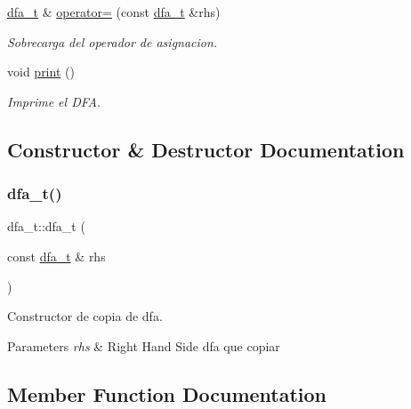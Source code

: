 \begin{DoxyCompactItemize}
\hyperlink{classdfa__t}{dfa\+\_\+t} \& \hyperlink{classdfa__t_a803484b912714d5694ddf7f7d1193915}{operator=} (const \hyperlink{classdfa__t}{dfa\+\_\+t} \&rhs)
\begin{DoxyCompactList}\small\item\em Sobrecarga del operador de asignacion. \end{DoxyCompactList}\item 
\mbox{\label{classdfa__t_a5b930f5a9713aac88e8ec47e1ff237b9}} 
void \hyperlink{classdfa__t_a5b930f5a9713aac88e8ec47e1ff237b9}{print} ()
\begin{DoxyCompactList}\small\item\em Imprime el D\+FA. \end{DoxyCompactList}\end{DoxyCompactItemize}


\subsection{Constructor \& Destructor Documentation}
\mbox{\label{classdfa__t_a3b578828ea13668680017fdc9fad8c86}} 
\subsubsection{\texorpdfstring{dfa\+\_\+t()}{dfa\_t()}}
{\footnotesize\ttfamily dfa\+\_\+t\+::dfa\+\_\+t (\begin{DoxyParamCaption}\item[{const \hyperlink{classdfa__t}{dfa\+\_\+t} \&}]{rhs }\end{DoxyParamCaption})\hspace{0.3cm}{\ttfamily [inline]}}



Constructor de copia de dfa. 


\begin{DoxyParams}{Parameters}
{\em rhs} & Right Hand Side dfa que copiar \\
\hline
\end{DoxyParams}


\subsection{Member Function Documentation}
\mbox{\label{classdfa__t_ab8d3e7309b0cf2fe8610edfa8803382a}} 
